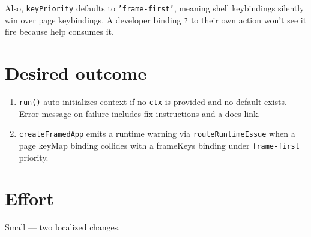 Also, \texttt{k\allowbreak{}e\allowbreak{}y\allowbreak{}P\allowbreak{}r\allowbreak{}i\allowbreak{}o\allowbreak{}r\allowbreak{}i\allowbreak{}t\allowbreak{}y} defaults to \texttt{'\allowbreak{}f\allowbreak{}r\allowbreak{}a\allowbreak{}m\allowbreak{}e\allowbreak{}-\allowbreak{}f\allowbreak{}i\allowbreak{}r\allowbreak{}s\allowbreak{}t\allowbreak{}'}, meaning shell keybindings silently win over page keybindings. A developer binding \texttt{?} to their own action won't see it fire because help consumes it.

\section{Desired outcome}\label{record-341-desired-outcome}

\begin{enumerate}
\def\labelenumi{\arabic{enumi}.}
\tightlist
\item
  \texttt{r\allowbreak{}u\allowbreak{}n\allowbreak{}(\allowbreak{})} auto-initializes context if no \texttt{c\allowbreak{}t\allowbreak{}x} is provided and no default exists. Error message on failure includes fix instructions and a docs link.
\item
  \texttt{c\allowbreak{}r\allowbreak{}e\allowbreak{}a\allowbreak{}t\allowbreak{}e\allowbreak{}F\allowbreak{}r\allowbreak{}a\allowbreak{}m\allowbreak{}e\allowbreak{}d\allowbreak{}A\allowbreak{}p\allowbreak{}p} emits a runtime warning via \texttt{r\allowbreak{}o\allowbreak{}u\allowbreak{}t\allowbreak{}e\allowbreak{}R\allowbreak{}u\allowbreak{}n\allowbreak{}t\allowbreak{}i\allowbreak{}m\allowbreak{}e\allowbreak{}I\allowbreak{}s\allowbreak{}s\allowbreak{}u\allowbreak{}e} when a page keyMap binding collides with a frameKeys binding under \texttt{f\allowbreak{}r\allowbreak{}a\allowbreak{}m\allowbreak{}e\allowbreak{}-\allowbreak{}f\allowbreak{}i\allowbreak{}r\allowbreak{}s\allowbreak{}t} priority.
\end{enumerate}

\section{Effort}\label{record-341-effort}

Small --- two localized changes.

